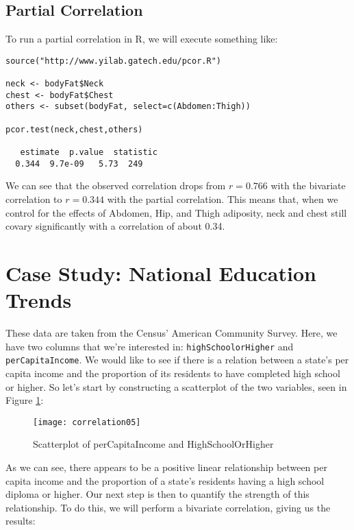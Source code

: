 \subsection{Partial Correlation}

To run a partial correlation in R, we will execute something like:

\begin{framed}
\begin{Verbatim}[samepage=TRUE]
source("http://www.yilab.gatech.edu/pcor.R")

neck <- bodyFat$Neck
chest <- bodyFat$Chest
others <- subset(bodyFat, select=c(Abdomen:Thigh))

pcor.test(neck,chest,others)

   estimate  p.value  statistic
  0.344  9.7e-09   5.73  249
\end{Verbatim}
\end{framed}

We can see that the observed correlation drops from \(r=0.766\) with the bivariate correlation to \(r=0.344\) with the partial correlation. This means that, when we control for the effects of Abdomen, Hip, and Thigh adiposity, neck and chest still covary significantly with a correlation of about 0.34.

\section{Case Study: National Education Trends}

These data are taken from the Census' American Community Survey. Here, we have two columns that we're interested in: \verb|highSchoolorHigher| and \verb|perCapitaIncome|. We would like to see if there is a relation between a state's per capita income and the proportion of its residents to have completed high school or higher. So let's start by constructing a scatterplot of the two variables, seen in Figure \ref{fig:correlation05}:

\begin{figure}[h!]
\texttt{[image: correlation05]}
\label{fig:correlation05}
\caption{Scatterplot of perCapitaIncome and HighSchoolOrHigher}
\end{figure}

As we can see, there appears to be a positive linear relationship between per capita income and the proportion of a state's residents having a high school diploma or higher. Our next step is then to quantify the strength of this relationship. To do this, we will perform a bivariate correlation, giving us the results:

